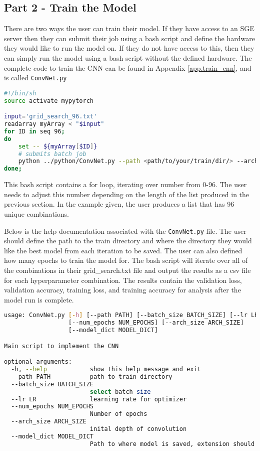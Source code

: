 \subsection*{Part 2 - Train the Model}
There are two ways the user can train their model. If they have access to an SGE server then they can submit their job using a bash script and define the hardware they would like to run the model on. If they do not have access to this, then they can simply run the model using a bash script without the defined hardware. The complete code to train the CNN can be found in Appendix \ref{app.train_cnn}, and is called \texttt{ConvNet.py}
\begin{lstlisting}[language=bash, caption = {Bash script to run the python file \texttt{ConvNet.py}. This will run the file locally on the User's own machine.}, label={lst.bash}]
#!/bin/sh
source activate mypytorch

input='grid_search_96.txt'
readarray myArray < "$input"
for ID in seq 96; 
do
    set -- ${myArray[$ID]}
    # submits batch job
    python ../python/ConvNet.py --path <path/to/your/train/dir/> --arch_size "$1" --lr "$2" --batch_size "$3" --model_dict <path/to/where/you/want/to/save/modelstate.pt>
done;
\end{lstlisting}
This bash script contains a for loop, iterating over number from 0-96. The user needs to adjust this number depending on the length of the list produced in the previous section. In the example given, the user produces a list that has 96 unique combinations. 
\par
Below is the help documentation associated with the \texttt{ConvNet.py} file. The user should define the path to the train directory and where the directory they would like the best model from each iteration to be saved. The user can also defined how many epochs to train the model for. The bash script will iterate over all of the combinations in their grid\_search.txt file and output the results as a csv file for each hyperparameter combination. The results contain the validation loss, validation accuracy, training loss, and training accuracy for analysis after the model run is complete. 
\begin{lstlisting}[language=bash, caption = {Help file associated with the script \texttt{ConvNet.py} Describes the various user defined arguments to run the script from the command line.}, label={lst.ConvNet_help}]
usage: ConvNet.py [-h] [--path PATH] [--batch_size BATCH_SIZE] [--lr LR]
                  [--num_epochs NUM_EPOCHS] [--arch_size ARCH_SIZE]
                  [--model_dict MODEL_DICT]

Main script to implement the CNN

optional arguments:
  -h, --help            show this help message and exit
  --path PATH           path to train directory
  --batch_size BATCH_SIZE
                        select batch size
  --lr LR               learning rate for optimizer
  --num_epochs NUM_EPOCHS
                        Number of epochs
  --arch_size ARCH_SIZE
                        inital depth of convolution
  --model_dict MODEL_DICT
                        Path to where model is saved, extension should be .pt
\end{lstlisting}
